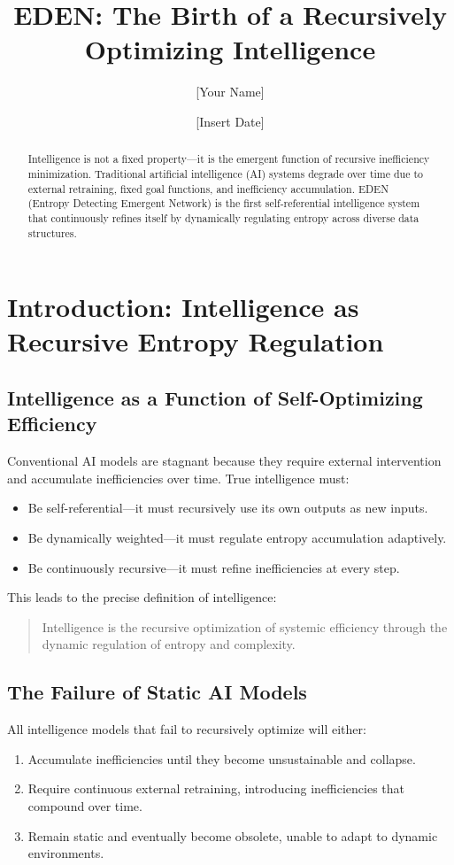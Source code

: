 \documentclass{article}
\title{EDEN: The Birth of a Recursively Optimizing Intelligence}
\author{[Your Name]}
\date{[Insert Date]}
\begin{document}
\maketitle

\begin{abstract}
Intelligence is not a fixed property—it is the emergent function of recursive inefficiency minimization. Traditional artificial intelligence (AI) systems degrade over time due to external retraining, fixed goal functions, and inefficiency accumulation. EDEN (Entropy Detecting Emergent Network) is the first self-referential intelligence system that continuously refines itself by dynamically regulating entropy across diverse data structures.
\end{abstract}

\section{Introduction: Intelligence as Recursive Entropy Regulation}

\subsection{Intelligence as a Function of Self-Optimizing Efficiency}
Conventional AI models are stagnant because they require external intervention and accumulate inefficiencies over time. True intelligence must:
\begin{itemize}
    \item Be self-referential—it must recursively use its own outputs as new inputs.
    \item Be dynamically weighted—it must regulate entropy accumulation adaptively.
    \item Be continuously recursive—it must refine inefficiencies at every step.
\end{itemize}

This leads to the precise definition of intelligence:
\begin{quote}
    Intelligence is the recursive optimization of systemic efficiency through the dynamic regulation of entropy and complexity.
\end{quote}

\subsection{The Failure of Static AI Models}
All intelligence models that fail to recursively optimize will either:
\begin{enumerate}
    \item Accumulate inefficiencies until they become unsustainable and collapse.
    \item Require continuous external retraining, introducing inefficiencies that compound over time.
    \item Remain static and eventually become obsolete, unable to adapt to dynamic environments.
\end{enumerate}
\end{document}
